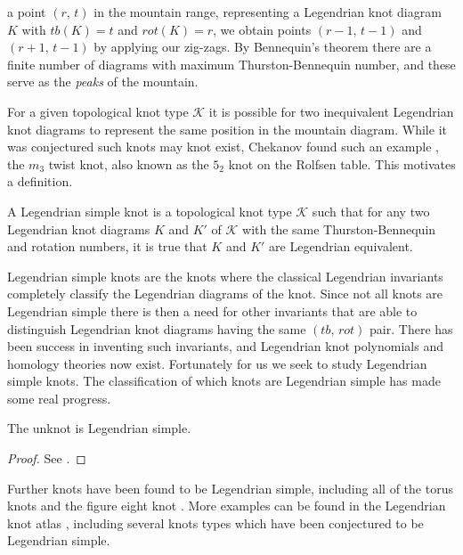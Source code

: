     a point $(r,\,t)$ in the mountain range, representing a Legendrian knot
    diagram $K$ with $tb(K)=t$ and $rot(K)=r$, we obtain points
    $(r-1,\,t-1)$ and $(r+1,\,t-1)$ by applying our zig-zags. By
    Bennequin's theorem there are a finite number of diagrams with
    maximum Thurston-Bennequin number, and these serve as the
    \textit{peaks} of the mountain.
    \par\hfill\par
    For a given topological knot type $\mathcal{K}$ it is possible for two
    inequivalent Legendrian knot diagrams to represent the same position in
    the mountain diagram. While it was conjectured such knots may knot exist,
    Chekanov found such an example \cite{ChekanovDifAlgOfLegLinks},
    the $m_{3}$ twist knot, also known as the $5_{2}$ knot on the Rolfsen
    table. This motivates a definition.
    \begin{definition}
        A Legendrian simple knot is a topological knot type $\mathcal{K}$
        such that for any two Legendrian knot diagrams $K$ and $K'$ of
        $\mathcal{K}$ with the same Thurston-Bennequin and rotation numbers,
        it is true that $K$ and $K'$ are Legendrian equivalent.
    \end{definition}
    Legendrian simple knots are the knots where the classical Legendrian
    invariants completely classify the Legendrian diagrams of the knot. Since
    not all knots are Legendrian simple there is then a need for other
    invariants that are able to distinguish Legendrian knot diagrams having
    the same $(tb,\,rot)$ pair. There has been success in inventing such
    invariants, and Legendrian knot polynomials and homology theories now
    exist. Fortunately for us we seek to study Legendrian simple knots. The
    classification of which knots are Legendrian simple has made some real
    progress.
    \begin{theorem}
        The unknot is Legendrian simple.
    \end{theorem}
    \begin{proof}
        See \cite{EliashbergFraserClassificationTopTrivialLegKnots}.
    \end{proof}
    Further knots have been found to be Legendrian simple, including all of the
    torus knots and the figure eight knot \cite{EtnyreHondaContactTopologyI}.
    More examples can be found in the Legendrian knot atlas
    \cite{LegendrianKnotAtlas}, including several knots types which have been
    conjectured to be Legendrian simple.
